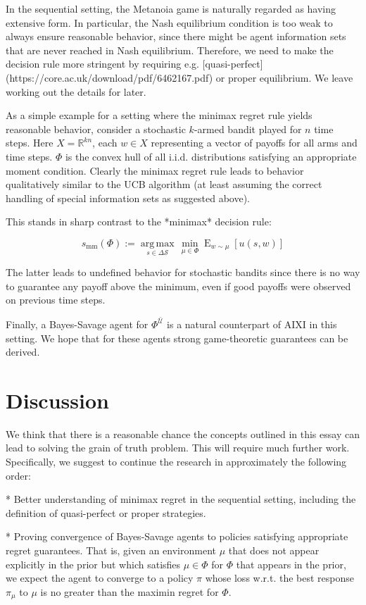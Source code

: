 \documentclass[a4paper]{article}
\DeclareMathOperator{\E}{E}
\newcommand{\Argmax}[1]{\underset{#1}{\operatorname{arg\,max}}\,}
\newcommand{\Reals}{\mathbb{R}}
\newcommand{\UTM}{\mathcal{U}}
\newcommand{\SP}[1]{\Delta #1}
\newcommand{\Strat}{\mathcal{S}}
\begin{document}
In the sequential setting, the Metanoia game is naturally regarded as having extensive form. In particular, the Nash equilibrium condition is too weak to always ensure reasonable behavior, since there might be agent information sets that are never reached in Nash equilibrium. Therefore, we need to make the decision rule more stringent by requiring e.g. [quasi-perfect](https://core.ac.uk/download/pdf/6462167.pdf) or proper equilibrium. We leave working out the details for later.

As a simple example for a setting where the minimax regret rule yields reasonable behavior, consider a stochastic ${k}$-armed bandit played for ${n}$ time steps. Here ${X = \Reals^{kn}}$, each ${w \in X}$ representing a vector of payoffs for all arms and time steps. ${\Phi}$ is the convex hull of all i.i.d. distributions satisfying an appropriate moment condition. Clearly the minimax regret rule leads to behavior qualitatively similar to the UCB algorithm (at least assuming the correct handling of special information sets as suggested above).

This stands in sharp contrast to the *minimax* decision rule:

$$s_{\text{mm}}(\Phi):=\Argmax{s \in \SP{\Strat}} \min_{\mu \in \Phi}\E_{w \sim \mu}[u(s,w)]$$

The latter leads to undefined behavior for stochastic bandits since there is no way to guarantee any payoff above the minimum, even if good payoffs were observed on previous time steps.

Finally, a Bayes-Savage agent for ${\Phi^{\bar{\UTM}}}$ is a natural counterpart of AIXI in this setting. We hope that for these agents strong game-theoretic guarantees can be derived.

\section{Discussion}

We think that there is a reasonable chance the concepts outlined in this essay can lead to solving the grain of truth problem. This will require much further work. Specifically, we suggest to continue the research in approximately the following order:

* Better understanding of minimax regret in the sequential setting, including the definition of quasi-perfect or proper strategies.

* Proving convergence of Bayes-Savage agents to policies satisfying appropriate regret guarantees. That is, given an environment ${\mu}$ that does not appear explicitly in the prior but which satisfies ${\mu \in \Phi}$ for ${\Phi}$ that appears in the prior, we expect the agent to converge to a policy ${\pi}$ whose loss w.r.t. the best response ${\pi_\mu}$ to ${\mu}$ is no greater than the maximin regret for ${\Phi}$.
\end{document}
